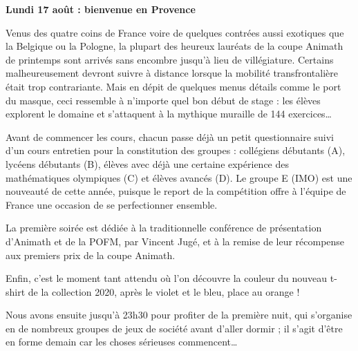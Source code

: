 \begin{center}
{\textbf{Lundi 17 août : bienvenue en Provence}}
\end{center}
\vspace{2mm}


Venus des quatre coins de France voire de quelques contrées aussi exotiques que la Belgique ou la Pologne, la plupart des heureux lauréats de la coupe Animath de printemps sont arrivés sans encombre jusqu’à lieu de villégiature. Certains malheureusement devront suivre à distance lorsque la mobilité transfrontalière était trop contrariante. Mais en dépit de quelques menus détails comme le port du masque, ceci ressemble à n’importe quel bon début de stage : les élèves explorent le domaine et s’attaquent à la mythique muraille de 144 exercices…


Avant de commencer les cours, chacun passe déjà un petit questionnaire suivi d’un cours entretien pour la constitution des groupes : collégiens débutants (A), lycéens débutants (B), élèves avec déjà une certaine expérience des mathématiques olympiques (C) et élèves avancés (D). Le groupe E (IMO) est une nouveauté de cette année, puisque le report de la compétition offre à l’équipe de France une occasion de se perfectionner ensemble.

La première soirée est dédiée à la traditionnelle conférence de présentation d’Animath et de la POFM, par Vincent Jugé, et à la remise de leur récompense aux premiers prix de la coupe Animath.



Enfin, c’est le moment tant attendu où l’on découvre la couleur du nouveau t-shirt de la collection 2020, après le violet et le bleu, place au orange !


Nous avons ensuite jusqu’à 23h30 pour profiter de la première nuit, qui s’organise en de nombreux groupes de jeux de société avant d’aller dormir ; il s’agit d’être en forme demain car les choses sérieuses commencent…


